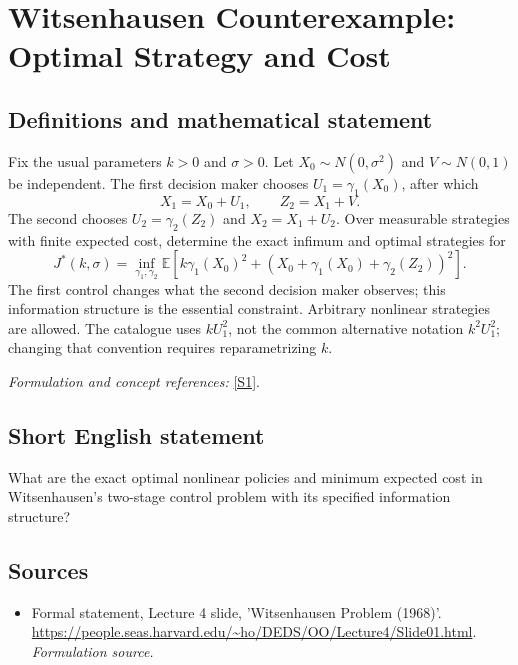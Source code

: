 \documentclass[11pt]{article}
\begin{document}
\section*{\texorpdfstring{Witsenhausen Counterexample: Optimal Strategy and Cost}{Witsenhausen Counterexample: Optimal Strategy and Cost}}\label{statement}
\subsection{Definitions and mathematical statement}
Fix the usual parameters $k>0$ and $\sigma>0$. Let $X_0\sim N(0,\sigma^2)$ and $V\sim N(0,1)$ be independent. The first decision maker chooses $U_1=\gamma_1(X_0)$, after which
\[
 X_1=X_0+U_1,\qquad Z_2=X_1+V.
\]
The second chooses $U_2=\gamma_2(Z_2)$ and $X_2=X_1+U_2$. Over measurable strategies with finite expected cost, determine the exact infimum and optimal strategies for
\[
 J^*(k,\sigma)=\inf_{\gamma_1,\gamma_2}
 {\mathbb{E}}\left[k\gamma_1(X_0)^2+
       (X_0+\gamma_1(X_0)+\gamma_2(Z_2))^2\right].
\]
The first control changes what the second decision maker observes; this information structure is the essential constraint. Arbitrary nonlinear strategies are allowed. The catalogue uses $kU_1^2$, not the common alternative notation $k^2U_1^2$; changing that convention requires reparametrizing $k$.
\par\smallskip\textit{Formulation and concept references:} \href{https://people.seas.harvard.edu/~ho/DEDS/OO/Lecture4/Slide01.html}{[S1]}.

\subsection{Short English statement}
What are the exact optimal nonlinear policies and minimum expected cost in Witsenhausen's two-stage control problem with its specified information structure?
\subsection{Sources}
\begin{itemize}
\item[S1]Formal statement, Lecture 4 slide, 'Witsenhausen Problem (1968)'.
\url{https://people.seas.harvard.edu/~ho/DEDS/OO/Lecture4/Slide01.html}.
\textit{Formulation source.}
\end{itemize}
\end{document}
